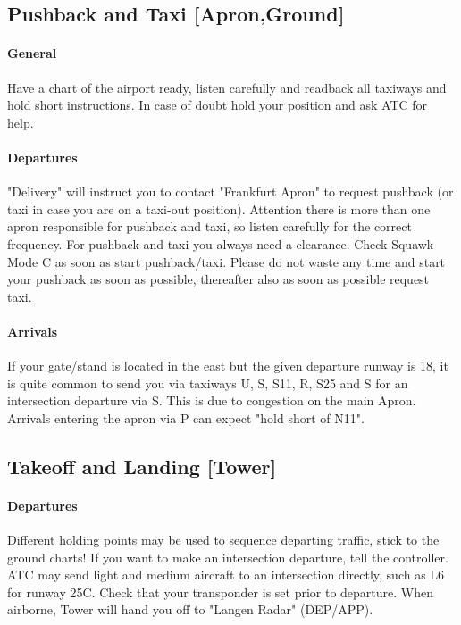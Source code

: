 \subsection[GND]{Pushback and Taxi [Apron,Ground]}
\paragraph{General}
Have a chart of the airport ready, listen carefully and readback all taxiways and hold short instructions. In case of doubt hold your position and ask ATC for help.

\paragraph{Departures}
"Delivery" will instruct you to contact "Frankfurt Apron" to request pushback (or taxi in case you are on a taxi-out position). Attention there is more than one apron responsible for pushback and taxi, so listen carefully for the correct frequency.
For pushback and taxi you always need a clearance.
Check Squawk Mode C as soon as start pushback/taxi.
Please do not waste any time and start your pushback as soon as possible, thereafter also as soon as possible request taxi.

\paragraph{Arrivals}
If your gate/stand is located in the east but the given departure runway is 18, it is quite common to send
you via taxiways U, S, S11, R, S25 and S for an intersection departure via S. This is due to congestion on the main Apron.
Arrivals entering the apron via P can expect "hold short of N11".

\subsection[TWR]{Takeoff and Landing [Tower]}

\paragraph{Departures}
Different holding points may be used to sequence departing traffic, stick to the ground charts!
If you want to make an intersection departure, tell the controller. ATC may send light and medium
aircraft to an intersection directly, such as L6 for runway 25C.
Check that your transponder is set prior to departure.
When airborne, Tower will hand you off to "Langen Radar" (DEP/APP). 

